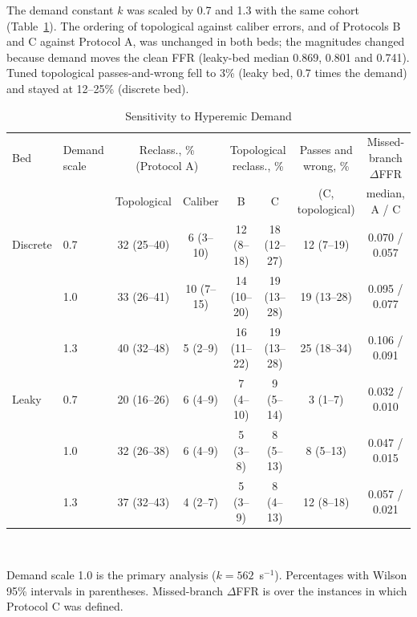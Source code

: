 The demand constant $k$ was scaled by 0.7 and 1.3 with the same cohort (Table~\ref{tab:demand}). The ordering of
topological against caliber errors, and of Protocols B and C against Protocol A, was unchanged in both beds; the
magnitudes changed because demand moves the clean FFR (leaky-bed median 0.869, 0.801 and 0.741). Tuned topological
passes-and-wrong fell to 3\% (leaky bed, 0.7 times the demand) and stayed at 12--25\% (discrete bed).
\begin{table}[!h]
\caption{Sensitivity to Hyperemic Demand}\label{tab:demand}
\centering\small
\begin{tabular}{@{}llcccccc@{}}
\toprule
Bed & Demand scale & \multicolumn{2}{c}{Reclass., \% (Protocol A)} & \multicolumn{2}{c}{Topological reclass., \%} &
Passes and wrong, \% & Missed-branch $\Delta$FFR\\
\cmidrule(lr){3-4}\cmidrule(lr){5-6}
 & & Topological & Caliber & B & C & (C, topological) & median, A / C\\
\midrule
Discrete & 0.7 & 32 (25--40) & 6 (3--10) & 12 (8--18) & 18 (12--27) & 12 (7--19) & 0.070 / 0.057 \\
 & 1.0 & 33 (26--41) & 10 (7--15) & 14 (10--20) & 19 (13--28) & 19 (13--28) & 0.095 / 0.077 \\
 & 1.3 & 40 (32--48) & 5 (2--9) & 16 (11--22) & 19 (13--28) & 25 (18--34) & 0.106 / 0.091 \\
Leaky & 0.7 & 20 (16--26) & 6 (4--9) & 7 (4--10) & 9 (5--14) & 3 (1--7) & 0.032 / 0.010 \\
 & 1.0 & 32 (26--38) & 6 (4--9) & 5 (3--8) & 8 (5--13) & 8 (5--13) & 0.047 / 0.015 \\
 & 1.3 & 37 (32--43) & 4 (2--7) & 5 (3--9) & 8 (4--13) & 12 (8--18) & 0.057 / 0.021 \\
\bottomrule
\end{tabular}
\\[3pt]
\parbox{0.9\textwidth}{\footnotesize Demand scale 1.0 is the primary analysis ($k = 562$~s$^{-1}$). Percentages with Wilson 95\%
intervals in parentheses. Missed-branch $\Delta$FFR is over the instances in which Protocol C was defined.}
\end{table}
